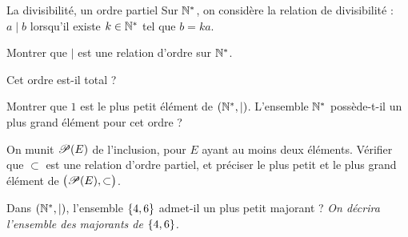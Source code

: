 \begin{exercice}[3]{La divisibilité, un ordre partiel}
Sur $\mathbb{N}^{*}$, on considère la relation de divisibilité : $a\mid b$ lorsqu'il
existe $k\in\mathbb{N}^{*}$ tel que $b=ka$.
\begin{questions}
  \item Montrer que $\mid$ est une relation d'ordre sur $\mathbb{N}^{*}$.
  \item Cet ordre est-il total ?
  \item Montrer que $1$ est le plus petit élément de $(\mathbb{N}^{*},\mid)$.
    L'ensemble $\mathbb{N}^{*}$ possède-t-il un plus grand élément pour cet ordre ?
  \item On munit $\mathscr{P}(E)$ de l'inclusion, pour $E$ ayant au moins deux
    éléments. Vérifier que $\subset$ est une relation d'ordre partiel, et
    préciser le plus petit et le plus grand élément de
    $\bigl(\mathscr{P}(E),\subset\bigr)$.
  \item Dans $(\mathbb{N}^{*},\mid)$, l'ensemble $\left\{4,6\right\}$ admet-il un plus petit
    majorant ? \emph{On décrira l'ensemble des majorants de $\left\{4,6\right\}$.}
\end{questions}
\end{exercice}

